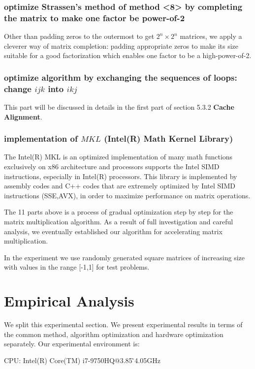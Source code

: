 \documentclass[UTF8]{ctexart}
\begin{document}
\subsubsection{optimize Strassen's method of method \textless8\textgreater{} by
  completing the matrix to make one factor be power-of-2}
Other than padding zeros to the outermost to get \(2^n\times2^n\)
matrices, we apply a cleverer way of matrix completion: padding
appropriate zeros to make its size suitable for a good factorization
which enables one factor to be a high-power-of-2.

\subsubsection{optimize algorithm by exchanging the sequences of loops:
  change \(ijk\) into \(ikj\)}

This part will be discussed in details in the first part of section 5.3.2 \textbf{Cache Alignment}.

\subsubsection{implementation of \(MKL\) (Intel(R) Math Kernel Library)}
The Intel(R) MKL is an optimized implementation of many math functions
exclusively on x86 architecture and processors supports the Intel SIMD
instructions, especially in Intel(R) processors. This library is
implemented by assembly codes and C++ codes that are extremely
optimized by Intel SIMD instructions (SSE,AVX), in order to maximize
performance on matrix operations.

The 11 parts above is a process of gradual optimization step by step for
the matrix multiplication algorithm. As a result of full investigation
and careful analysis, we eventually established our algorithm for
accelerating matrix multiplication.

In the experiment we use randomly generated square matrices of
increasing size with values in the range {[}-1,1{]} for test problems.

\section{Empirical Analysis}
\label{sec::EmpAnlys}
We split this experimental section. We present experimental results in
terms of the common method, algorithm optimization and hardware
optimization separately. Our experimental environment is:

CPU: Intel(R) Core(TM) i7-9750HQ@3.85 ̃4.05GHz
\end{document}
